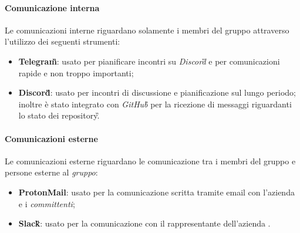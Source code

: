 	\paragraph{Comunicazione interna}
		Le comunicazioni interne riguardano solamente i membri del gruppo \teamname{} attraverso l'utilizzo dei seguenti strumenti:
			\begin{itemize}
				\item \textbf{Telegram\G}: usato per pianificare incontri su \emph{Discord}\G{} e per comunicazioni rapide e non troppo importanti;
				\item \textbf{Discord\G}: usato per incontri di discussione e pianificazione sul lungo periodo; inoltre è stato integrato con \emph{GitHub\G{}} per la ricezione di messaggi riguardanti lo stato dei repository\G.
			\end{itemize}
	\paragraph{Comunicazioni esterne}
	\label{sec:Comunicazioni esterne}
		Le comunicazioni esterne riguardano le comunicazione tra i membri del gruppo \teamname e persone esterne al \emph{gruppo}:
			\begin{itemize}
				\item \textbf{ProtonMail}: usato per la comunicazione scritta tramite email con l'azienda \proponente e i \emph{committenti};
				\item \textbf{Slack\G}: usato per la comunicazione con il rappresentante dell'azienda \proponente.
			\end{itemize}
